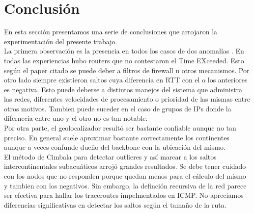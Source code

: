 \section{Conclusión}

En esta sección presentamos una serie de conclusiones que arrojaron la experimentación del presente trabajo.\\

La primera observación es la presencia en todos los casos de dos anomalías \cite{Anomalias}. En todas las experiencias hubo routers que no contestaron el Time EXceeded. Esto según el paper citado se puede deber a filtros de firewall u otros mecanismos. Por otro lado siempre existieron saltos cuya diferencia en RTT con el o los anteriores es negativa. Esto puede deberse a distintos manejos del sistema que administra las redes, diferentes velocidades de procesamiento o prioridad de las mismas entre otros motivos. Tambien puede suceder en el caso de grupos de IPs donde la difernecia entre uno y el otro no es tan notable.\\

Por otra parte, el geolocalizador resultó ser bastante confiable aunque no tan preciso. En general suele aproximar bastante correctamente los continentes aunque a veces confunde dueño del backbone con la ubicación del mismo.\\

El método de Cimbala para detectar outlieres y así marcar a los saltos intercontinentales subacuáticos arrojó grandes resultados. Se debe tener cuidado con los nodos que no responden porque quedan menos para el cálculo del mismo y tambien con los negativos. Sin embargo, la definción recursiva de la red parece ser efectiva para hallar los traceroutes impelmentados en ICMP. No apreciamos diferencias significativas en detectar los saltos según el tamaño de la ruta.
